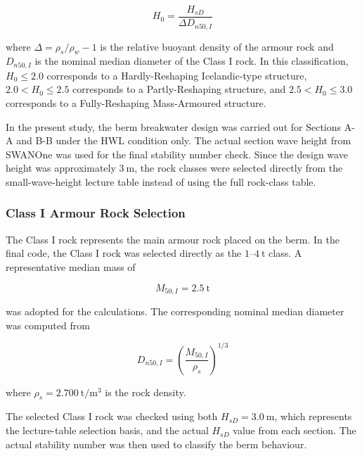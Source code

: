 \documentclass[a4paper, 11pt]{article}
\begin{document}
\begin{equation}
    H_0 = \frac{H_{sD}}{\Delta D_{n50,I}}
    \label{eq:berm_stability_number}
\end{equation}

where \(\Delta=\rho_s/\rho_w-1\) is the relative buoyant density of the armour rock and \(D_{n50,I}\) is the nominal median diameter of the Class I rock. In this classification, \(H_0 \leq 2.0\) corresponds to a Hardly-Reshaping Icelandic-type structure, \(2.0 < H_0 \leq 2.5\) corresponds to a Partly-Reshaping structure, and \(2.5 < H_0 \leq 3.0\) corresponds to a Fully-Reshaping Mass-Armoured structure.

In the present study, the berm breakwater design was carried out for Sections A-A and B-B under the HWL condition only. The actual section wave height from SWANOne was used for the final stability number check. Since the design wave height was approximately \(3~\mathrm{m}\), the rock classes were selected directly from the small-wave-height lecture table instead of using the full rock-class table.

\subsubsection{Class I Armour Rock Selection}

\hspace*{0.5cm} The Class I rock represents the main armour rock placed on the berm. In the final code, the Class I rock was selected directly as the \(1\text{--}4~\mathrm{t}\) class. A representative median mass of

\begin{equation}
    M_{50,I}=2.5~\mathrm{t}
\end{equation}

was adopted for the calculations. The corresponding nominal median diameter was computed from

\begin{equation}
    D_{n50,I}=\left(\frac{M_{50,I}}{\rho_s}\right)^{1/3}
    \label{eq:berm_dn50_I}
\end{equation}

where \(\rho_s=2.700~\mathrm{t/m^3}\) is the rock density.

The selected Class I rock was checked using both \(H_{sD}=3.0~\mathrm{m}\), which represents the lecture-table selection basis, and the actual \(H_{sD}\) value from each section. The actual stability number was then used to classify the berm behaviour.
\end{document}
